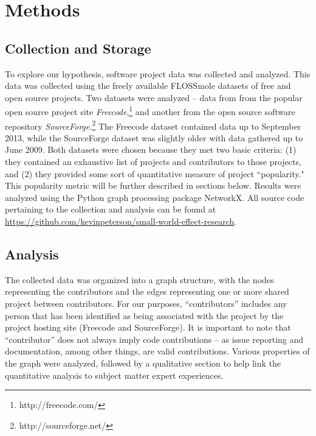 \documentclass{proc}
\begin{document}
\section{Methods}

\subsection{Collection and Storage}
To explore our hypothesis, software project data was collected and analyzed. This data was collected using the freely available FLOSSmole\cite{floss2006} datasets of free and open source projects. Two datasets were analyzed -- data from from the popular open source project site \textit{Freecode},\footnote{http://freecode.com/} and another from the open source software repository \textit{SourceForge}.\footnote{http://sourceforge.net/} The Freecode dataset contained data up to September 2013, while the SourceForge dataset was slightly older with data gathered up to June 2009. Both datasets were chosen because they met two basic criteria: (1) they contained an exhaustive list of projects and contributors to those projects, and (2) they provided some sort of quantitative measure of project ``popularity." This popularity metric will be further described in sections below. Results were analyzed using the Python graph processing package NetworkX\cite{hagberg-2008-exploring}. All source code pertaining to the collection and analysis can be found at \url{https://github.com/kevinpeterson/small-world-effect-research}.

\subsection{Analysis}
The collected data was organized into a graph structure, with the nodes representing the contributors and the edges representing one or more shared project between contributors. For our purposes, ``contributors'' includes any person that has been identified as being associated with the project by the project hosting site (Freecode and SourceForge). It is important to note that ``contributor'' does not always imply code contributions -- as issue reporting and documentation, among other things, are valid contributions. Various properties of the graph were analyzed, followed by a qualitative section to help link the quantitative analysis to subject matter expert experiences.
\end{document}
